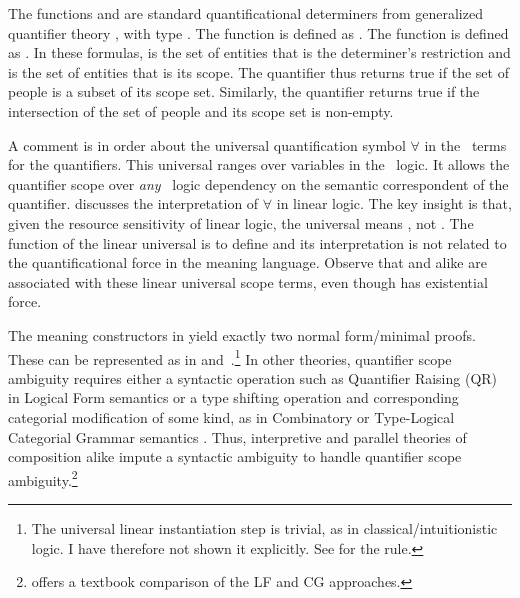\documentclass[output=paper,hidelinks]{langscibook}
\begin{document}
\begin{sloppypar}
  \noindent The functions  and  are standard quantificational
  determiners from generalized quantifier theory
  \citep{montague73,barwise;cooper81,keenan;faltz85}, with type
  . The function
   is defined
  as . The function
   is defined as 
  . In these formulas, 
   is the set of entities that is the determiner's
  restriction and  is the set of entities that is its
  scope.  The quantifier  thus returns true if the set
  of people is a subset of its scope set. Similarly, the quantifier
   returns true if the
  intersection of the set of people and its scope set is non-empty.
\end{sloppypar}

A comment is in order about 
the universal quantification symbol $\forall$ in the \glue\ 
terms for the quantifiers. This universal ranges over variables in the \glue\ logic. It
allows the quantifier scope over \emph{any}  \glue\ logic
  dependency on the semantic correspondent of the quantifier. 
\citet[393--394]{Asudeh05reln} discusses the
interpretation of $\forall$ in linear logic. The
key insight is that, given the resource sensitivity of linear
logic, the universal means , not
. The function of the linear universal is to define \aterm{scope
  points} and its interpretation is not related to the
quantificational force in the meaning language. Observe that  and
 alike are   associated with these linear universal
scope terms, even though \IT{some} has existential force.

\hspace*{-5.5pt}The meaning constructors in  yield exactly two
normal form/minimal proofs. These can be represented as in
 and~.\footnote{The
  universal linear instantiation step is trivial, as in
  classical/intuitionistic logic. I have therefore not shown it
  explicitly. See \citet[396]{Asudeh12} for the rule.} In other
theories, quantifier scope ambiguity requires either a syntactic operation such as
Quantifier Raising (QR) in Logical Form semantics
\citep{may77,may85,heim1998semantics} or a type shifting operation and corresponding categorial
modification of some kind, as in
Combinatory or Type-Logical Categorial Grammar semantics
\citep{partee;rooth83,hendriks93}. Thus, interpretive and parallel
theories of composition alike impute a syntactic ambiguity to handle
quantifier scope ambiguity.\footnote{\citet[ch.\,14]{jacobson14} offers a
  textbook comparison of the LF and CG approaches.}
\end{document}
